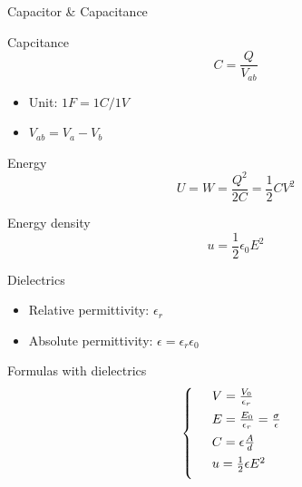 \documentclass{beamer}
\begin{document}
\begin{frame}{Capacitor \& Capacitance}
    \begin{beamerboxesrounded}[shadow=true]{Capcitance}
        \begin{equation}
            C = \frac{Q}{V_{ab}}
        \end{equation}
    \end{beamerboxesrounded}
    \begin{itemize}
        \item Unit: $1F = 1C/1V$
        \item $V_{ab} = V_a - V_b$
    \end{itemize}

    \begin{beamerboxesrounded}[shadow = true]{Energy}
        \begin{equation}
            U = W = \frac{Q^2}{2C} = \frac{1}{2} CV^2 
        \end{equation}
    \end{beamerboxesrounded}

    \begin{block}{Energy density}
        \begin{equation}
            u = \frac{1}{2} \epsilon_0 E^2
        \end{equation}
    \end{block}     
\end{frame}


\begin{frame}{Dielectrics}
    \begin{itemize}
        \item Relative permittivity: $ \epsilon_r $
        \item Absolute permittivity: $ \epsilon = \epsilon_r \epsilon_0 $
    \end{itemize}
    \vfill
    \begin{beamerboxesrounded}[shadow=true]{Formulas with dielectrics}
        \begin{equation}
            \left\{
                \begin{array}{ll}
                    \vspace{.5em}
                   & V = \frac{V_0}{\epsilon_r} \\ \vspace{.5em}
                   & E = \frac{E_0}{\epsilon_r} = \frac{\sigma}{\epsilon} \\ \vspace{.5em}
                   & C = \epsilon \frac{A}{d} \\\vspace{.5em}
                   & u = \frac{1}{2} \epsilon E^2
                \end{array}
            \right.
        \end{equation}
    \end{beamerboxesrounded}    
\end{frame}
\end{document}
